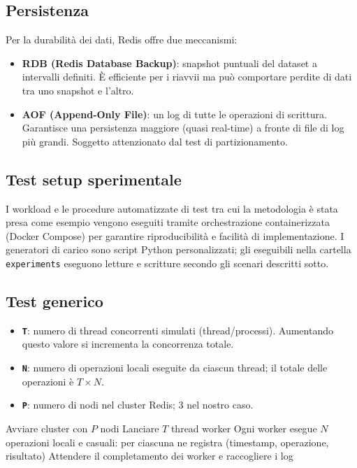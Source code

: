 \documentclass{article}
\begin{document}
\subsection{Persistenza}
Per la durabilità dei dati, Redis offre due meccanismi:
\begin{itemize}
    \item \textbf{RDB (Redis Database Backup)}: snapshot puntuali del dataset a intervalli definiti. È efficiente per i riavvii ma può comportare perdite di dati tra uno snapshot e l'altro.
    \item \textbf{AOF (Append-Only File)}: un log di tutte le operazioni di %
scrittura. Garantisce una persistenza maggiore (quasi real-time) a fronte %
di file di log più grandi. Soggetto attenzionato dal test di partizionamento.
\end{itemize}


\subsection{Test setup sperimentale}
I workload e le procedure automatizzate di test tra cui la metodologia è stata presa come esempio \cite{Jepsen} vengono eseguiti tramite orchestrazione containerizzata %
(Docker Compose) per garantire riproducibilità e facilità di implementazione. %
I generatori di carico sono script Python personalizzati; %
gli eseguibili nella cartella \texttt{experiments} eseguono letture e scritture secondo gli scenari descritti sotto.


\subsection{Test generico}
\begin{itemize}
    \item \textbf{\texttt{T}}: numero di thread concorrenti simulati (thread/processi). Aumentando questo valore si incrementa la concorrenza totale.
    \item \textbf{\texttt{N}}: numero di operazioni locali eseguite da ciascun thread; il totale delle operazioni è $T \times N$.
    \item \textbf{\texttt{P}}: numero di nodi nel cluster Redis; 3 nel nostro caso.
\end{itemize}

\begin{algorithm}
\caption{Test generico}
\begin{algorithmic}[1]
    \State Avviare cluster con $P$ nodi
    \State Lanciare $T$ thread worker
        \State Ogni worker esegue $N$ operazioni locali e casuali: 
        \State \quad per ciascuna ne registra (timestamp, operazione, risultato)
    \EndFor
    \State Attendere il completamento dei worker e raccogliere i log
\EndProcedure
\end{algorithmic}
\end{algorithm}
\end{document}
